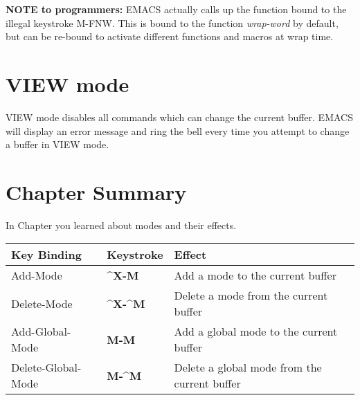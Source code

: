 {\bf NOTE to programmers:}
EMACS actually calls up the function bound to the illegal
keystroke M-FNW.  This is bound to the function {\it{}wrap-word}
 by default, but can be re-bound to activate different
functions and macros at wrap time.

\section{VIEW mode}

VIEW mode disables all commands which can change the current
buffer.  EMACS will display an error message and ring the bell every
time you attempt to change a buffer in VIEW mode.
\section{Chapter \thechapter{} Summary}

In Chapter \thechapter{} you learned about modes and their effects.

\begin{tabular}{llp{4in}}
Key Binding & Keystroke & Effect \\ \hline
Add-Mode & {\bf{}\^{}X-M} & Add a mode to the current buffer\\
Delete-Mode & {\bf{}\^{}X-\^{}M} & Delete a mode from the current buffer\\
Add-Global-Mode & {\bf{}M-M} & Add a global mode to the
current buffer\\
Delete-Global-Mode & {\bf{}M-\^{}M} & Delete a global mode from the
current buffer\\
\end{tabular}

